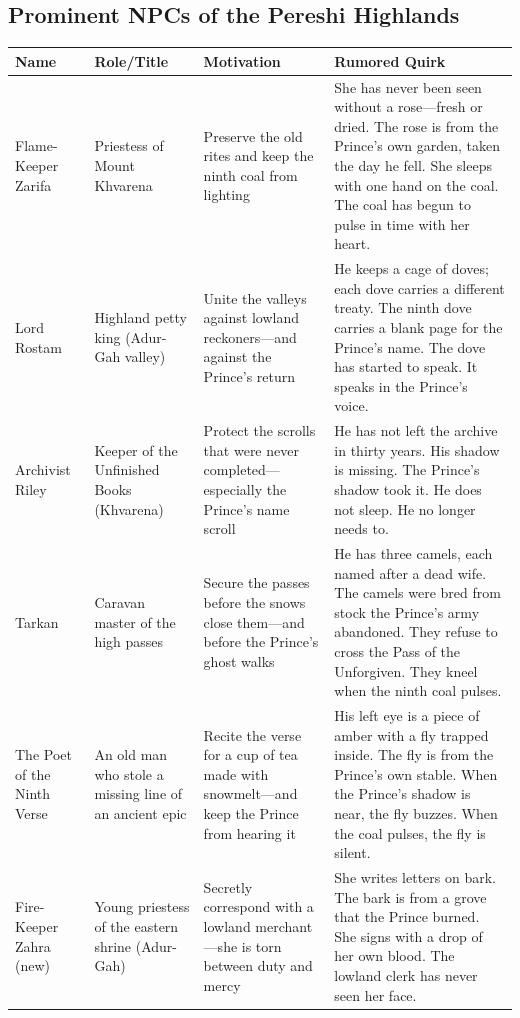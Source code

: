 \subsection*{Prominent NPCs of the Pereshi Highlands}
\label{sec:pereshi-npcs}

\begin{longtable}{|p{}|p{}|p{}|p{}|}
\hline
\textbf{Name} & \textbf{Role/Title} & \textbf{Motivation} & \textbf{Rumored Quirk} \\
\hline
Flame-Keeper Zarifa & Priestess of Mount Khvarena & Preserve the old rites and keep the ninth coal from lighting & She has never been seen without a rose---fresh or dried. The rose is from the Prince's own garden, taken the day he fell. She sleeps with one hand on the coal. The coal has begun to pulse in time with her heart. \\
\hline
Lord Rostam & Highland petty king (Adur-Gah valley) & Unite the valleys against lowland reckoners---and against the Prince's return & He keeps a cage of doves; each dove carries a different treaty. The ninth dove carries a blank page for the Prince's name. The dove has started to speak. It speaks in the Prince's voice. \\
\hline
Archivist Riley & Keeper of the Unfinished Books (Khvarena) & Protect the scrolls that were never completed---especially the Prince's name scroll & He has not left the archive in thirty years. His shadow is missing. The Prince's shadow took it. He does not sleep. He no longer needs to. \\
\hline
Tarkan & Caravan master of the high passes & Secure the passes before the snows close them---and before the Prince's ghost walks & He has three camels, each named after a dead wife. The camels were bred from stock the Prince's army abandoned. They refuse to cross the Pass of the Unforgiven. They kneel when the ninth coal pulses. \\
\hline
The Poet of the Ninth Verse & An old man who stole a missing line of an ancient epic & Recite the verse for a cup of tea made with snowmelt---and keep the Prince from hearing it & His left eye is a piece of amber with a fly trapped inside. The fly is from the Prince's own stable. When the Prince's shadow is near, the fly buzzes. When the coal pulses, the fly is silent. \\
\hline
Fire-Keeper Zahra (new) & Young priestess of the eastern shrine (Adur-Gah) & Secretly correspond with a lowland merchant---she is torn between duty and mercy & She writes letters on bark. The bark is from a grove that the Prince burned. She signs with a drop of her own blood. The lowland clerk has never seen her face. \\

\end{longtable}
